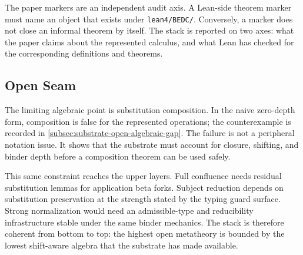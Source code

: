 The paper markers are an independent audit axis. A Lean-side theorem marker
must name an object that exists under \texttt{lean4/BEDC/}. Conversely, a
marker does not close an informal theorem by itself. The stack is reported on
two axes: what the paper claims about the represented calculus, and what Lean
has checked for the corresponding definitions and theorems.

\subsection{Open Seam}
\label{subsec:substrate-stack-open-seam}

The limiting algebraic point is substitution composition. In the naive
zero-depth form, composition is false for the represented operations; the
counterexample is recorded in
\autoref{subsec:substrate-open-algebraic-gap}. The failure is not a peripheral
notation issue. It shows that the substrate must account for closure,
shifting, and binder depth before a composition theorem can be used safely.

This same constraint reaches the upper layers. Full confluence needs residual
substitution lemmas for application beta forks. Subject reduction depends on
substitution preservation at the strength stated by the typing guard surface.
Strong normalization would need an admissible-type and reducibility
infrastructure stable under the same binder mechanics. The stack is therefore
coherent from bottom to top: the highest open metatheory is bounded by the
lowest shift-aware algebra that the substrate has made available.
